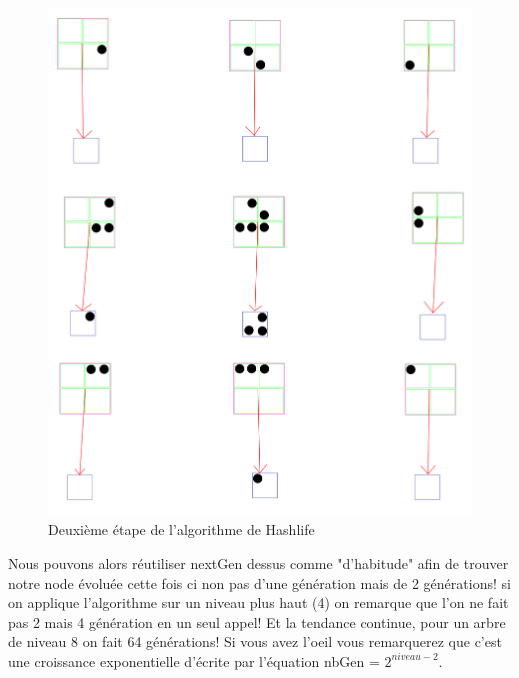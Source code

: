 \begin{figure}[H]
        \center
        \includegraphics[scale=0.1]{images/imgHashlife/HashlifeStep2.png}
        \caption{Deuxième étape de l'algorithme de Hashlife}
\end{figure}
Nous pouvons alors réutiliser nextGen dessus comme "d'habitude" afin de trouver notre node évoluée cette fois ci non pas d'une génération mais de 2 générations! si on applique l'algorithme sur un niveau plus haut (4) on remarque que l'on ne fait pas 2 mais 4 génération en un seul appel! Et la tendance continue, pour un arbre de niveau 8 on fait 64 générations! Si vous avez l'oeil vous remarquerez que c'est une croissance exponentielle d'écrite par l'équation nbGen = $2^{niveau-2}$.
